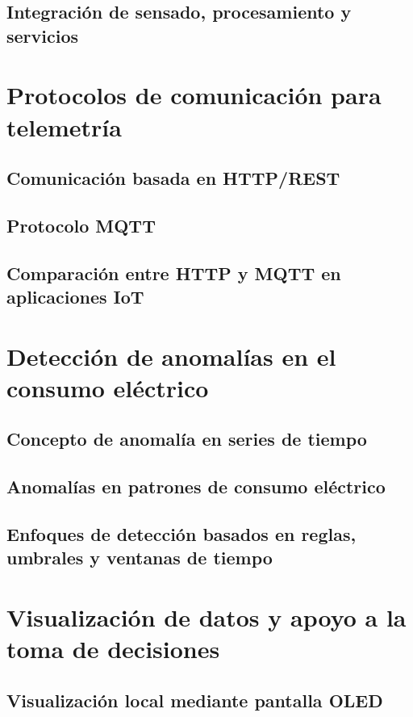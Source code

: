 ﻿\documentclass[12pt,openright,oneside]{report}
\theoremstyle{mytheoremstyle}
\theoremstyle{mytheoremstyle}
\theoremstyle{myproblemstyle}
\begin{document}
\subsection{Integración de sensado, procesamiento y servicios}

\section{Protocolos de comunicación para telemetría}
\label{sec:protocolos_comunicacion}

\subsection{Comunicación basada en HTTP/REST}
\subsection{Protocolo MQTT}
\subsection{Comparación entre HTTP y MQTT en aplicaciones IoT}

\section{Detección de anomalías en el consumo eléctrico}
\label{sec:deteccion_anomalias}

\subsection{Concepto de anomalía en series de tiempo}
\subsection{Anomalías en patrones de consumo eléctrico}
\subsection{Enfoques de detección basados en reglas, umbrales y ventanas de tiempo}

\section{Visualización de datos y apoyo a la toma de decisiones}
\label{sec:visualizacion_datos}

\subsection{Visualización local mediante pantalla OLED}
\end{document}
